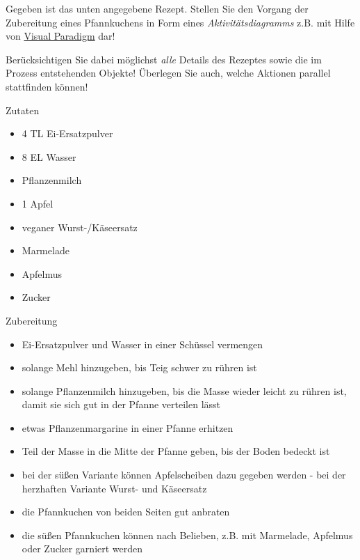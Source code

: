 \documentclass{abgabe}
\begin{document}
\begin{questions}

    Gegeben ist das unten angegebene Rezept.
    Stellen Sie den Vorgang der Zubereitung eines Pfannkuchens in Form eines \emph{Aktivitätsdiagramms} z.B. mit Hilfe von \href{https://www.ili.fh-aachen.de/ilias.php?baseClass=ilLinkResourceHandlerGUI&ref_id=341847&cmd=calldirectlink}{Visual Paradigm} dar!

    Berücksichtigen Sie dabei möglichst \emph{alle} Details des Rezeptes sowie die im Prozess entstehenden Objekte! Überlegen Sie auch, welche Aktionen parallel stattfinden können!

    {\large Zutaten}\footnotemark
    \begin{itemize}
        \item 4 TL Ei-Ersatzpulver
        \item 8 EL Wasser
        \item Pflanzenmilch
        \item 1 Apfel
        \item veganer Wurst-/Käseersatz
        \item Marmelade
        \item Apfelmus
        \item Zucker
    \end{itemize}

    {\large Zubereitung}
    \begin{itemize}
        \item Ei-Ersatzpulver und Wasser in einer Schüssel vermengen
        \item solange Mehl hinzugeben, bis Teig schwer zu rühren ist
        \item solange Pflanzenmilch hinzugeben, bis die Masse wieder leicht zu rühren ist, damit sie sich gut in der Pfanne verteilen lässt
        \item etwas Pflanzenmargarine in einer Pfanne erhitzen
        \item Teil der Masse in die Mitte der Pfanne geben, bis der Boden bedeckt ist
        \item bei der süßen Variante können Apfelscheiben dazu gegeben werden - bei der herzhaften Variante Wurst- und Käseersatz
        \item die Pfannkuchen von beiden Seiten gut anbraten
        \item die süßen Pfannkuchen können nach Belieben, z.B. mit Marmelade, Apfelmus oder Zucker garniert werden
    \end{itemize}


\end{questions}
\end{document}
